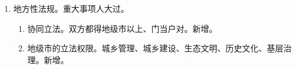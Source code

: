 \begin{enumerate}
\begin{enumerate}
\begin{enumerate}
\begin{enumerate}
                        \end{enumerate}
                  \item 决定。大事开会，小事传批。会 = 常委会。
                  \item 公布。
                        \begin{enumerate}
                          \item 网站、报纸、国务院公报。公报可以有多个，均是标准文本。
                          \item 总理签署、国务院令，军事类加上中央军委主席。
                        \end{enumerate}
                  \item 生效。一般 30 日。金融、外汇、货币政策；国家安全等可立即生效。
                  \item 备案。公布后 30 日内国务院的办公厅报全人常备案。\sjt 日期只有一个数 30。
                  \item 解释。提要求即可，程序很简单。。
                        \begin{enumerate}
                          \item 补充规定/补充设定。沈报国。进一步明确含义 \hz 出现新情况。省、部级机关报国务院。
                          \item 应用问题。沈法报国。省、部级的法制机构报国务院法制机构。专业对口。
                          \item 解释权属于国务院。
                          \item 行政法规的解释与行政法规具有同等效力。
                        \end{enumerate}
                  \item 评估。国务院部门。
                  \item 停止。国务院决定。。
                  \item 冲突。国务院裁决。
                  \item 抵触。。
                \end{enumerate}
        \end{enumerate}
  \item 地方性法规。重大事项人大过。
        \begin{enumerate}
          \item 协同立法。双方都得地级市以上、门当户对。新增。
          \item 地级市的立法权限。城乡管理、城乡建设、生态文明、历史文化、基层治理。新增。

\end{enumerate}
\end{enumerate}
